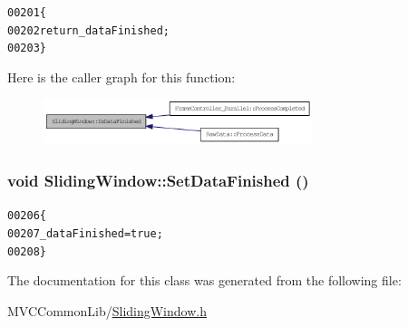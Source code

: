 \begin{footnotesize}\begin{alltt}
00201         \{
00202                 \textcolor{keywordflow}{return} \_dataFinished;
00203         \}
\end{alltt}\end{footnotesize}




Here is the caller graph for this function:\nopagebreak
\begin{figure}[H]
\begin{center}
\leavevmode
\includegraphics[width=222pt]{class_sliding_window_afd67521d283b68f9fbc769ee9c0ba4b4_icgraph}
\end{center}
\end{figure}


\hypertarget{class_sliding_window_ac2fd5605777fc2f4fdff84282a8467f8}{
\subsubsection[{SetDataFinished}]{\setlength{\rightskip}{0pt plus 5cm}void SlidingWindow::SetDataFinished ()}}
\label{class_sliding_window_ac2fd5605777fc2f4fdff84282a8467f8}




\begin{footnotesize}\begin{alltt}
00206         \{
00207                 \_dataFinished = \textcolor{keyword}{true};
00208         \}
\end{alltt}\end{footnotesize}




The documentation for this class was generated from the following file:\begin{DoxyCompactItemize}
\item 
MVCCommonLib/\hyperlink{_sliding_window_8h}{SlidingWindow.h}\end{DoxyCompactItemize}
